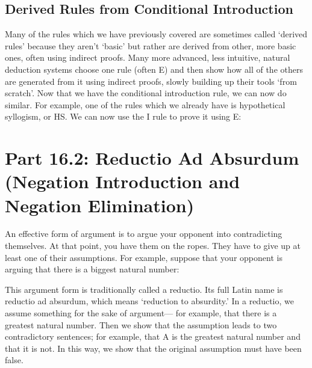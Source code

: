 \subsection{Derived Rules from Conditional Introduction}

Many of the rules which we have previously covered are sometimes called `derived rules' because they aren't `basic' but rather are derived from other, more basic ones, often using indirect proofs. Many more advanced, less intuitive, natural deduction systems choose one rule (often \eif E) and then show how all of the others are generated from it using indirect proofs, slowly building up their tools `from scratch'. Now that we have the conditional introduction rule, we can now do similar. For example, one of the rules which we already have is hypothetical syllogism, or HS. We can now use the \eif I rule to prove it using \eif E:
\begin{fitchproof}
\open
\close
{} 
\end{fitchproof}		
\section{Part 16.2: Reductio Ad Absurdum (Negation Introduction and Negation Elimination)}
An effective form of argument is to argue your opponent into contradicting themselves. At that point, you have them on the ropes. They have to give up at least one of their assumptions. For example, suppose that your opponent is arguing that there is a biggest natural number:

This argument form is traditionally called a reductio. Its full Latin name is reductio ad absurdum, which means ‘reduction to absurdity.’ In a reductio, we assume something for the sake of argument— for example, that there is a greatest natural number. Then we show that the assumption leads to two contradictory sentences; for example, that A is the greatest natural number and that it is not. In this way, we show that the original assumption must have been false.

